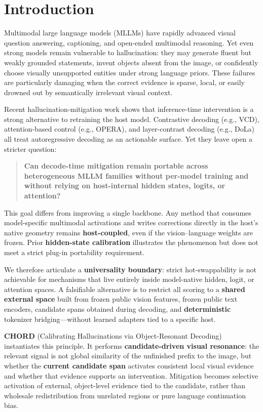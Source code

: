 \section{Introduction}
\label{sec:intro}

Multimodal large language models (MLLMs) have rapidly advanced visual question answering, captioning, and open-ended multimodal reasoning. Yet even strong models remain vulnerable to hallucination: they may generate fluent but weakly grounded statements, invent objects absent from the image, or confidently choose visually unsupported entities under strong language priors. These failures are particularly damaging when the correct evidence is sparse, local, or easily drowned out by semantically irrelevant visual context.

Recent hallucination-mitigation work shows that inference-time intervention is a strong alternative to retraining the host model. Contrastive decoding (e.g., VCD), attention-based control (e.g., OPERA), and layer-contrast decoding (e.g., DoLa) all treat autoregressive decoding as an actionable surface. Yet they leave open a stricter question:

\begin{quote}
\textbf{Can decode-time mitigation remain portable across heterogeneous MLLM families without per-model training and without relying on host-internal hidden states, logits, or attention?}
\end{quote}

This goal differs from improving a single backbone. Any method that consumes model-specific multimodal activations and writes corrections directly in the host's native geometry remains \textbf{host-coupled}, even if the vision--language weights are frozen. Prior \textbf{hidden-state calibration} illustrates the phenomenon but does not meet a strict plug-in portability requirement.

We therefore articulate a \textbf{universality boundary}: strict hot-swappability is not achievable for mechanisms that live entirely inside model-native hidden, logit, or attention spaces. A falsifiable alternative is to restrict all scoring to a \textbf{shared external space} built from frozen public vision features, frozen public text encoders, candidate spans obtained during decoding, and \textbf{deterministic} tokenizer bridging---without learned adapters tied to a specific host.

\textbf{CHORD} (Calibrating Hallucinations via Object-Resonant Decoding) instantiates this principle. It performs \textbf{candidate-driven visual resonance}: the relevant signal is not global similarity of the unfinished prefix to the image, but whether the \textbf{current candidate span} activates consistent local visual evidence and whether that evidence supports an intervention. Mitigation becomes selective activation of external, object-level evidence tied to the candidate, rather than wholesale redistribution from unrelated regions or pure language continuation bias.

